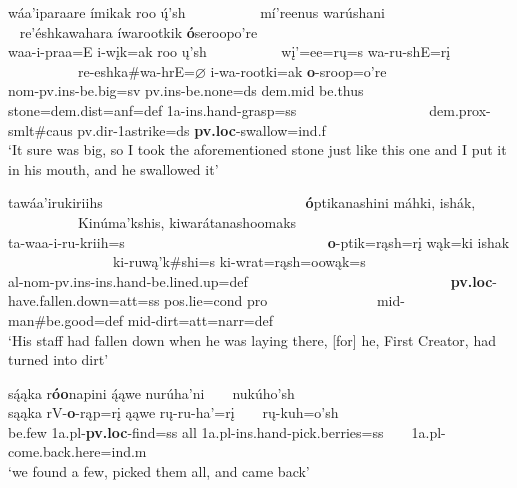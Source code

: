 \begin{exe}
\begin{xlist}
	\item \glll wáa'iparaare ímikak roo ų́'sh ~ ~ ~ ~ ~ ~  mí'reenus warúshani ~ ~ ~ ~ ~ ~ ~ ~ ~ ~ ~ re'éshkawahara íwarootkik \textbf{ó}seroopo're\\
	waa-i-praa=E i-wįk=ak roo ų'sh ~ ~ ~ ~ ~ ~  wį'=ee=rų=s wa-ru-shE=rį ~ ~ ~ ~ ~ ~ ~ ~ ~ ~ ~ re-eshka\#wa-hrE=$\varnothing$ i-wa-rootki=ak \textbf{o}-sroop=o're\\
	nom-pv.ins-\textnormal{be.big}=sv pv.ins-\textnormal{be.none}=ds dem.mid \textnormal{be.thus} ~ ~ ~ ~ ~ ~  \textnormal{stone}=dem.dist=anf=def 1a-ins.hand-\textnormal{grasp}=ss ~ ~ ~ ~ ~ ~ ~ ~ ~ ~ ~ dem.prox-smlt\#caus pv.dir-1a\textnormal{strike}=ds \textbf{pv.loc}-\textnormal{swallow}=ind.f\\
	\glt `It sure was big, so I took the aforementioned stone just like this one and I put it in his mouth, and he swallowed it' \citep[99]{hollow1973a}
	
	\item \glll tawáa'irukiriihs ~ ~ ~ ~ ~ ~ ~ ~ ~ ~ ~ ~ ~ ~ ~ ~ ~  \textbf{ó}ptikanashini máhki, ishák, ~ ~ ~ ~ ~ ~ ~ ~ ~  Kinúma'kshis, kiwarátanashoomaks\\
	ta-waa-i-ru-kriih=s ~ ~ ~ ~ ~ ~ ~ ~ ~ ~ ~ ~ ~ ~ ~ ~ ~ \textbf{o}-ptik=rąsh=rį wąk=ki ishak ~ ~ ~ ~ ~ ~ ~ ~ ~  ki-ruwą'k\#shi=s ki-wrat=rąsh=oowąk=s\\
	al-nom-pv.ins-ins.hand-\textnormal{be.lined.up}=def ~ ~ ~ ~ ~ ~ ~ ~ ~ ~ ~ ~ ~ ~ ~ ~ ~ \textbf{pv.loc}-\textnormal{have.fallen.down}=att=ss pos.lie=cond pro ~ ~ ~ ~ ~ ~ ~ ~ ~  mid-\textnormal{man\#be.good}=def mid-\textnormal{dirt}=att=narr=def\\
	\glt `His staff had fallen down when he was laying there, [for] he, First Creator, had turned into dirt' \citep[8]{hollow1973a}
	
	\item \glll są́ąka r\textbf{óo}napini ą́ąwe nurúha'ni ~ ~ nukúho'sh\\
	sąąka rV-\textbf{o}-rąp=rį ąąwe rų-ru-ha'=rį ~ ~  rų-kuh=o'sh\\
	\textnormal{be.few} 1a.pl-\textbf{pv.loc}-\textnormal{find}=ss \textnormal{all} 1a.pl-ins.hand-\textnormal{pick.berries}=ss ~ ~ 1a.pl-\textnormal{come.back.here}=ind.m\\
	\glt `we found a few, picked them all, and came back' \citep[52]{hollow1970}

	\end{xlist}

\end{exe}


